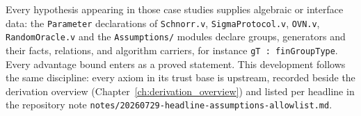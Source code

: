 Every hypothesis appearing in those case studies supplies algebraic or
interface data: the \texttt{Parameter} declarations of \texttt{Schnorr.v},
\texttt{SigmaProtocol.v}, \texttt{OVN.v}, \texttt{RandomOracle.v} and the
\texttt{Assumptions/} modules declare groups, generators and their facts,
relations, and algorithm carriers, for instance
\texttt{gT :\ finGroupType}. Every advantage bound enters as a proved
statement. This development follows the same discipline: every axiom in its
trust base is upstream, recorded beside the derivation overview
(Chapter~\ref{ch:derivation_overview}) and listed per headline in the
repository note \texttt{notes/20260729-headline-assumptions-allowlist.md}.
